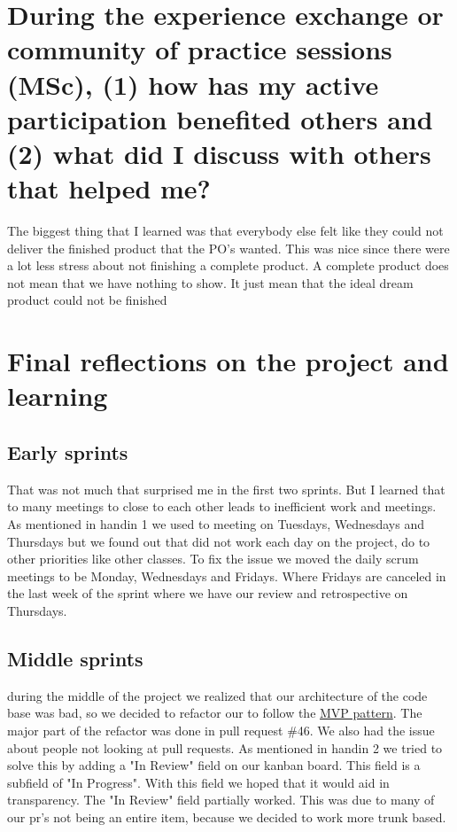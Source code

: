 \documentclass{article}
\begin{document}
\section{During the experience exchange or community of practice sessions (MSc), (1) how has my active participation benefited others and (2) what did I discuss with others that helped me?}
\label{sec:exchange}
The biggest thing that I learned was that everybody else felt like they could not deliver the finished product that the PO's wanted. This was nice since there were a lot less stress about not finishing a complete product. 
A complete product does not mean that we have nothing to show. It just mean that the ideal dream product could not be finished

\section{Final reflections on the project and learning}

\subsection{Early sprints}
That was not much that surprised me in the first two sprints. But I learned that to many meetings to close to each other leads to inefficient work and meetings.
As mentioned in handin 1 we used to meeting on Tuesdays, Wednesdays and Thursdays but we found out that did not work each day on the project, do to other priorities like other classes. 
To fix the issue we moved the daily scrum meetings to be Monday, Wednesdays and Fridays. Where Fridays are canceled in the last week of the sprint where we have our review and retrospective on Thursdays.
\subsection{Middle sprints}
during the middle of the project we realized that our architecture of the code base was bad, so we decided to refactor our to follow the \href{https://en.wikipedia.org/wiki/Model-view-presenter}{MVP pattern}. The major part of the refactor was done in pull request \#46.
We also had the issue about people not looking at pull requests. As mentioned in handin 2 we tried to solve this by adding a "In Review" field on our kanban board. This field is a subfield of "In Progress". With this field we hoped that it would aid in transparency.
The "In Review" field partially worked. This was due to many of our pr's not being an entire item, because we decided to work more trunk based.
\end{document}
